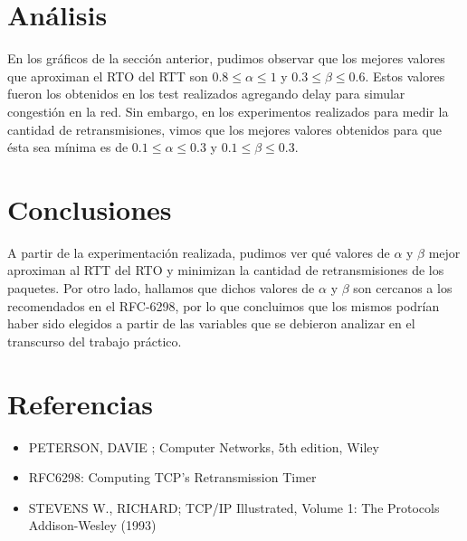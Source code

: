 \documentclass[10pt, a4paper]{article}
\begin{document}

\newpage
\section{Análisis}
En los gráficos de la sección anterior, pudimos observar que los mejores valores que aproximan el RTO del RTT son $ 0.8 \leq \alpha \leq 1$ y $ 0.3 \leq  \beta \leq 0.6$. Estos valores fueron los obtenidos en los test realizados agregando delay para simular congestión en la red.
Sin embargo, en los experimentos realizados para medir la cantidad de retransmisiones, vimos que los mejores valores obtenidos para que ésta sea mínima es de $ 0.1 \leq \alpha \leq 0.3$ y $ 0.1 \leq  \beta \leq 0.3$.

\newpage
\section{Conclusiones}
A partir de la experimentación realizada, pudimos ver qué valores de $\alpha$ y $\beta$ mejor aproximan al RTT del RTO y minimizan la cantidad de retransmisiones de los paquetes.
Por otro lado, hallamos que dichos valores de $\alpha$ y $\beta$ son cercanos a los recomendados en el RFC-6298, por lo que concluimos que los mismos podrían haber sido elegidos a partir de las variables que se debieron analizar en el transcurso del trabajo práctico.

\section{Referencias}
\begin{itemize}
\item PETERSON, DAVIE ; Computer Networks, 5th edition, Wiley

\item{RFC6298: Computing TCP's Retransmission Timer}

\item{STEVENS W., RICHARD; TCP/IP Illustrated, Volume 1: The Protocols Addison-Wesley (1993)}

\end{itemize}
\end{document}
